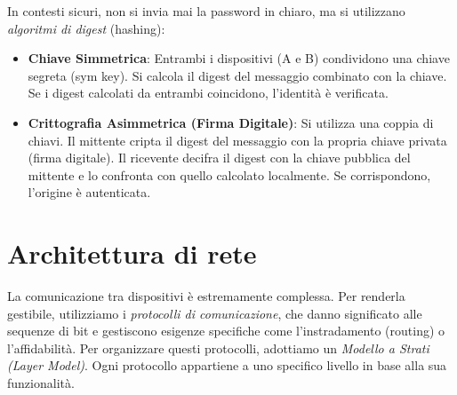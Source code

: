 \begin{figure}
    \caption{}\label{graph:auth}
\end{figure}


In contesti sicuri, non si invia mai la password in chiaro, ma si utilizzano \emph{algoritmi di digest} (hashing):
\begin{itemize}
    \item \textbf{Chiave Simmetrica}: Entrambi i dispositivi (A e B) condividono una chiave segreta (sym key). Si calcola il digest del messaggio combinato con la chiave. Se i digest calcolati da entrambi coincidono, l'identità è verificata.
    \item \textbf{Crittografia Asimmetrica (Firma Digitale)}: Si utilizza una coppia di chiavi. Il mittente cripta il digest del messaggio con la propria chiave privata (firma digitale). Il ricevente decifra il digest con la chiave pubblica del mittente e lo confronta con quello calcolato localmente. Se corrispondono, l'origine è autenticata.
\end{itemize}

%
\section{Architettura di rete}
La comunicazione tra dispositivi è estremamente complessa. Per renderla gestibile, utilizziamo i \emph{protocolli di comunicazione}, che danno significato alle sequenze di bit e gestiscono esigenze specifiche come l'instradamento (routing) o l'affidabilità.
Per organizzare questi protocolli, adottiamo un \emph{Modello a Strati (Layer Model)}. Ogni protocollo appartiene a uno specifico livello in base alla sua funzionalità.

